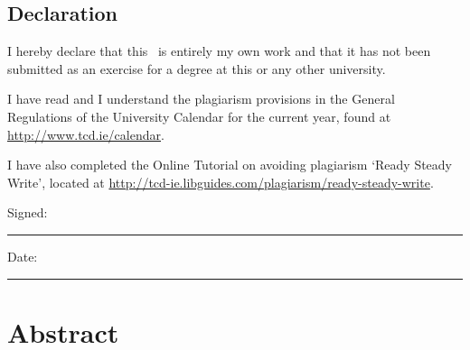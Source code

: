 \title{\thesistitle}
\author{\authorname}

\frontmatter


\doublespacing

\section*{Declaration}
I hereby declare that this \typeofthesis\ is entirely my own work and that it has not been submitted as an exercise for a degree at this or any other university.

I have read and I understand the plagiarism provisions in the General Regulations of the University Calendar for the current year, found at \url{http://www.tcd.ie/calendar}.

I have also completed the Online Tutorial on avoiding plagiarism `Ready Steady Write', located at \url{http://tcd-ie.libguides.com/plagiarism/ready-steady-write}.
\vspace{1cm}

Signed:~\rule{5cm}{0.3pt}\hfill Date:~\rule{5cm}{0.3pt}

\newpage
\chapter{Abstract}


